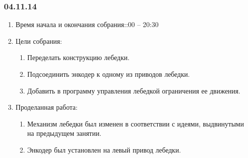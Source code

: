 
\subsubsection{04.11.14}

\begin{enumerate}
	\item Время начала и окончания собрания::00 – 20:30
	\item Цели собрания:\newline
	\begin{enumerate}
	  \item	Переделать конструкцию лебедки.\newline
	  
	  \item	Подсоединить энкодер к одному из приводов лебедки.\newline
	  
	  \item	Добавить в программу управления лебедкой ограничения ее движения.\newline
	  
    \end{enumerate}
    
	\item Проделанная работа:\newline
	\begin{enumerate}
	  \item	Механизм лебедки был изменен в соответствии с идеями, выдвинутыми на предыдущем занятии.\newline
      
      \item	Энкодер был установлен на левый привод лебедки.\newline
      

\end{enumerate}
\end{enumerate}
